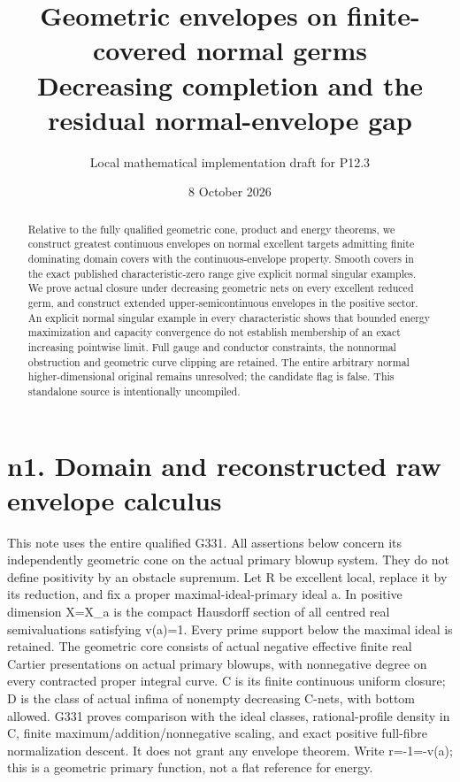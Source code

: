 \documentclass[11pt]{article}
\title{Geometric envelopes on finite-covered normal germs\\
Decreasing completion and the residual normal-envelope gap}
\author{Local mathematical implementation draft for P12.3}
\date{8 October 2026}
\begin{document}
\maketitle
\begin{abstract}
Relative to the fully qualified geometric cone, product and energy theorems,
we construct greatest continuous envelopes on normal excellent targets
admitting finite dominating domain covers with the continuous-envelope
property. Smooth covers in the exact published characteristic-zero range
give explicit normal singular examples. We prove actual closure under
decreasing geometric nets on every excellent reduced germ, and construct
extended upper-semicontinuous envelopes in the positive sector. An explicit
normal singular example in every characteristic shows that bounded energy
maximization and capacity convergence do not establish membership of an
exact increasing pointwise limit. Full gauge and conductor constraints,
the nonnormal obstruction and geometric curve clipping are retained.
The entire arbitrary normal higher-dimensional original remains unresolved;
the candidate flag is false. This standalone source is intentionally uncompiled.
\end{abstract}
\tableofcontents
\newpage
\section{n1. Domain and reconstructed raw envelope calculus}

This note uses the entire qualified G331. All assertions below concern its independently geometric cone on the actual primary blowup system. They do not define positivity by an obstacle supremum. Let R be excellent local, replace it by its reduction, and fix a proper maximal-ideal-primary ideal a. In positive dimension X=X\_a is the compact Hausdorff section of all centred real semivaluations satisfying v(a)=1. Every prime support below the maximal ideal is retained. The geometric core consists of actual negative effective finite real Cartier presentations on actual primary blowups, with nonnegative degree on every contracted proper integral curve. C is its finite continuous uniform closure; D is the class of actual infima of nonempty decreasing C-nets, with bottom allowed. G331 proves comparison with the ideal classes, rational-profile density in C, finite maximum/addition/nonnegative scaling, and exact positive full-fibre normalization descent. It does not grant any envelope theorem. Write r=-1=-v(a); this is a geometric primary function, not a flat reference for energy.
\end{document}
